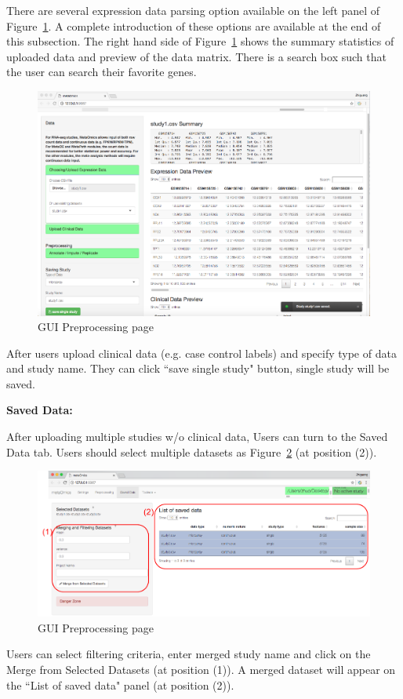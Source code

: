 \begin{steps}
There are several expression data parsing option available on the left panel of Figure~\ref{fig:GUIpreview}.
A complete introduction of these options are available at the end of this subsection.
The right hand side of Figure~\ref{fig:GUIpreview} shows the summary statistics of uploaded data and preview of the data matrix.
There is a search box such that the user can search their favorite genes.

\begin{figure}[H]
\begin{center}
\includegraphics[scale=0.35]{./figure/preprocessing/GUIpreview}
\caption{GUI Preprocessing page}
\label{fig:GUIpreview}
\end{center}
\end{figure}
After users upload clinical data (e.g. case control labels) and specify type of data and study name.
They can click ``save single study" button, single study will be saved.

\item \textbf{Saved Data:}

After uploading multiple studies w/o clinical data,
Users can turn to the Saved Data tab.
Users should select multiple datasets as Figure~\ref{fig:GUImerge} (at position {\color{red} (2)}).
\begin{figure}[H]
\begin{center}
\includegraphics[scale=0.35]{./figure/preprocessing/GUImerge}
\caption{GUI Preprocessing page}
\label{fig:GUImerge}
\end{center}
\end{figure}
Users can select filtering criteria, enter merged study name and click on the Merge from Selected Datasets (at position {\color{red} (1)}).
A merged dataset will appear on the  ``List of saved data" panel (at position {\color{red} (2)}).


\end{steps}
